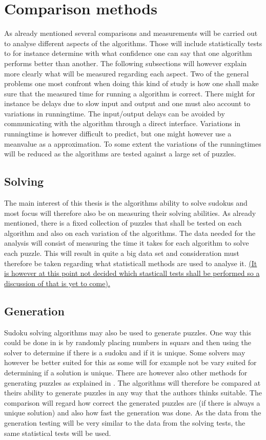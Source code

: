 \documentclass[a4paper,11pt]{kth-mag}
\begin{document}
\section{Comparison methods}
As already mentioned several comparisons and measurements will be carried out to 
analyse different aspects of the algorithms.
Those will include statistically tests 
to for instance determine with what confidence one can say that one algorithm performs 
better than another. 
The following subsections will however explain more clearly what will be measured 
regarding each aspect. 
Two of the general problems one most confront when doing this kind of study is how one 
shall make sure that the measured time for  running a algorithm is correct. 
There might for instance be delays due to slow input and output and one must also account 
to variations in runningtime. 
The input/output delays can be avoided by communicating with the algorithm through a 
direct interface. 
Variations in runningtime is however difficult to predict, but one might however use a 
meanvalue as a approximation. 
To some extent the variations of the runningtimes will be reduced as the algorithms are tested against a large set of puzzles.  

\subsection{Solving}
The main interest of this thesis is the algorithms ability to solve sudokus and most focus will therefore also be on measuring their solving abilities.
As already mentioned, there is a fixed collection of puzzles that shall be tested on each algorithm and also on each variation of the algorithms.
The data needed for the analysis will consist of measuring the time it takes for each algorithm to solve each puzzle.
This will result in quite a big data set and consideration must therefore be taken regarding what statisticall methods are used to analyse it. 
\underline{(It is however at this point not decided which stasticall tests shall be performed so a discussion of that is yet to come).}

\subsection{Generation}
Sudoku solving algorithms may also be used to generate puzzles.
One way this could be done in is by randomly placing numbers in squars and then using the solver to determine if there is a sudoku and if it is unique.
Some solvers may however be better suited for this as some will for example not be vary suited for determining if a solution is unique.
There are however also other methods for generating puzzles as explained in \cite{generation}.
The algorithms will therefore be compared at theirs ability to generate puzzles in any way that the authors thinks suitable.
The comparison will regard how correct the generated puzzles are (if there is always a unique solution) and also how fast the generation was done.
As the data from the generation testing will be very similar to the data from the solving tests, the same statistical tests will be used.
\end{document}
